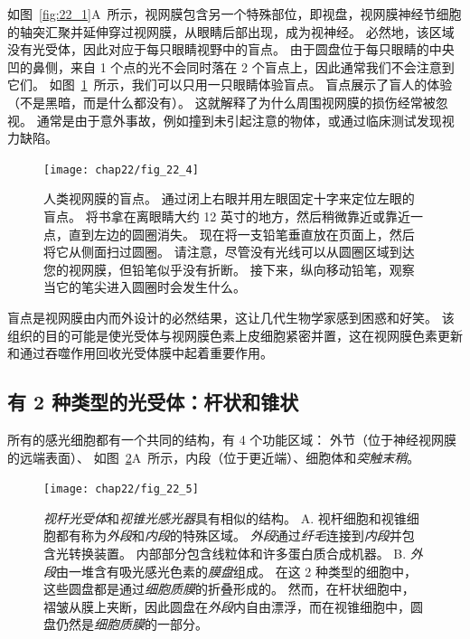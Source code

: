 如图~\ref{fig:22_1}A~所示，视网膜包含另一个特殊部位，即视盘，视网膜神经节细胞的轴突汇聚并延伸穿过视网膜，从眼睛后部出现，成为视神经。
必然地，该区域没有光受体，因此对应于每只眼睛视野中的盲点。
由于圆盘位于每只眼睛的中央凹的鼻侧，来自 1 个点的光不会同时落在 2 个盲点上，因此通常我们不会注意到它们。
如图~\ref{fig:22_4}~所示，我们可以只用一只眼睛体验盲点。
盲点展示了盲人的体验（不是黑暗，而是什么都没有）。
这就解释了为什么周围视网膜的损伤经常被忽视。
通常是由于意外事故，例如撞到未引起注意的物体，或通过临床测试发现视力缺陷。


\begin{figure}[htbp]
	\centering
	\texttt{[image: chap22/fig\_22\_4]}
	\caption{人类视网膜的盲点。
		通过闭上右眼并用左眼固定十字来定位左眼的盲点。
		将书拿在离眼睛大约 12 英寸的地方，然后稍微靠近或靠近一点，直到左边的圆圈消失。 
		现在将一支铅笔垂直放在页面上，然后将它从侧面扫过圆圈。 
		请注意，尽管没有光线可以从圆圈区域到达您的视网膜，但铅笔似乎没有折断。 
		接下来，纵向移动铅笔，观察当它的笔尖进入圆圈时会发生什么\cite{hurvich1981color}。}
	\label{fig:22_4}
\end{figure}


盲点是视网膜由内而外设计的必然结果，这让几代生物学家感到困惑和好笑。
该组织的目的可能是使光受体与视网膜色素上皮细胞紧密并置，这在视网膜色素更新和通过吞噬作用回收光受体膜中起着重要作用。


\subsection{有 2 种类型的光受体：杆状和锥状}

所有的感光细胞都有一个共同的结构，有 4 个功能区域：
外节（位于神经视网膜的远端表面）、
如图~\ref{fig:22_5}A~所示，内段（位于更近端）、细胞体和\textit{突触末稍}。


\begin{figure}[htbp]
	\centering
	\texttt{[image: chap22/fig\_22\_5]}
	\caption{\textit{视杆光受体}和\textit{视锥光感光器}具有相似的结构。
		A. 视杆细胞和视锥细胞都有称为\textit{外段}和\textit{内段}的特殊区域。
		\textit{外段}通过\textit{纤毛}连接到\textit{内段}并包含光转换装置。
		内部部分包含线粒体和许多蛋白质合成机器。
		B. \textit{外段}由一堆含有吸光感光色素的\textit{膜盘}组成。
		在这 2 种类型的细胞中，这些圆盘都是通过\textit{细胞质膜}的折叠形成的。
		然而，在杆状细胞中，褶皱从膜上夹断，因此圆盘在\textit{外段}内自由漂浮，而在视锥细胞中，圆盘仍然是\textit{细胞质膜}的一部分\cite{o1982chemistry,young1970visual}。}
	\label{fig:22_5}
\end{figure}


